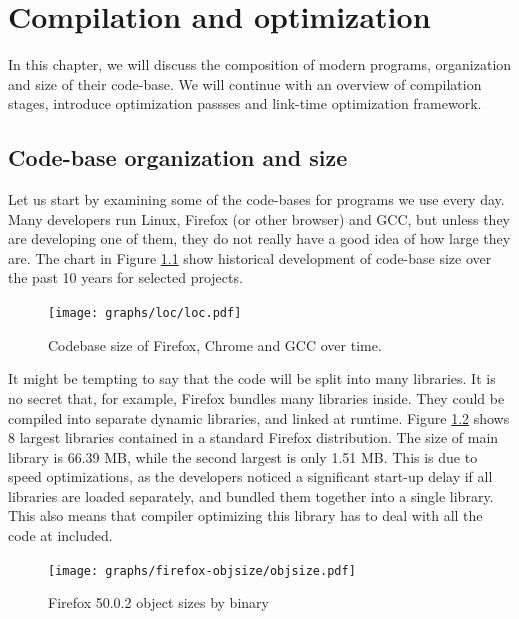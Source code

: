 \newcommand{\definice}{\paragraph{Definice.}}

\chapter{Compilation and optimization}

In this chapter, we will discuss the composition of modern
programs, organization and size of their code-base. We will continue with an
overview of compilation stages, introduce optimization passses and link-time
optimization framework.

\section{Code-base organization and size}

Let us start by examining some of the code-bases for programs we use every day.
Many developers run Linux, Firefox (or other browser) and GCC, but
unless they are developing one of them, they do not really have a good idea of how large
they are. The chart in Figure \ref{figure-loc} show historical development of
code-base size over the past 10 years for selected projects.

\begin{figure}[h!]
\centering
	\hspace{-1cm}\texttt{[image: graphs/loc/loc.pdf]}
\caption{Codebase size of Firefox, Chrome and GCC over time. }
\label{figure-loc}
\end{figure}

It might be tempting to say that the code will be split into many libraries. It
is no secret that, for example, Firefox bundles many libraries inside. They
could be compiled into separate dynamic libraries, and linked at runtime. Figure
\ref{figure-firefox-objsize} shows 8 largest libraries contained in a standard
Firefox distribution. The size of main library is 66.39 MB, while the second
largest is only 1.51 MB. This is due to speed optimizations, as the developers
noticed a significant start-up delay if all libraries are loaded separately, and
bundled them together into a single library. This also means that compiler
optimizing this library has to deal with all the code at included.

\begin{figure}[h!]
\centering
\texttt{[image: graphs/firefox-objsize/objsize.pdf]}
\caption{Firefox 50.0.2 object sizes by binary}
\label{figure-firefox-objsize}
\end{figure}

